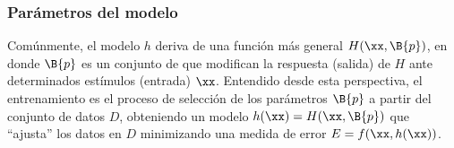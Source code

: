 %
\subsubsection{Parámetros del modelo}
%
Comúnmente, el modelo $h$ deriva de una función más general
$H(\xx,\B{p})$, en donde $\B{p}$ es un conjunto de  que
modifican la respuesta (salida) de $H$ ante determinados estímulos
(entrada) $\xx$.
Entendido desde esta perspectiva, el {entrenamiento} es el proceso de
selección de los parámetros $\B{p}$ a partir del conjunto de datos
$D$, obteniendo un modelo $h(\xx)=H(\xx,\B{p})$ que ``ajusta'' los
datos en $D$ minimizando una medida de error $E=f(\xx,h(\xx))$.
